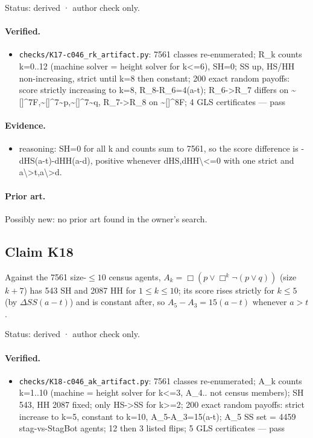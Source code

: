 \documentclass{article}
\begin{document}
Status: derived · author check only.

\paragraph{Verified.}
\begin{itemize}
\item \texttt{checks/K17-c046\_rk\_artifact.py}: 7561 classes re-enumerated; R\_k counts k=0..12 (machine solver = height solver for k\textless{}=6), SH=0; SS up, HS/HH non-increasing, strict until k=8 then constant; 200 exact random payoffs: score strictly increasing to k=8, R\_8-R\_6=4(a-t); R\_6-\textgreater{}R\_7 differs on \textasciitilde{}[]\textasciicircum{}7F,\textasciitilde{}[]\textasciicircum{}7\textasciitilde{}p,\textasciitilde{}[]\textasciicircum{}7\textasciitilde{}q, R\_7-\textgreater{}R\_8 on \textasciitilde{}[]\textasciicircum{}8F; 4 GLS certificates --- pass
\end{itemize}

\paragraph{Evidence.}
\begin{itemize}
\item reasoning: SH=0 for all k and counts sum to 7561, so the score difference is -dHS(a-t)-dHH(a-d), positive whenever dHS,dHH\textbackslash{}\textless{}=0 with one strict and a\textbackslash{}\textgreater{}t,a\textbackslash{}\textgreater{}d.
\end{itemize}

\paragraph{Prior art.} Possibly new: no prior art found in the owner's search.

\subsection*{Claim K18}

Against the 7561 size-$\le10$ census agents, $A_k=\Box(p\lor\Box^k\neg(p\lor q))$ (size $k+7$) has 543 SH and 2087 HH for $1\le k\le10$; its score rises strictly for $k\le5$ (by $\Delta SS(a-t)$) and is constant after, so $A_5-A_3=15(a-t)$ whenever $a>t$.

Status: derived · author check only.

\paragraph{Verified.}
\begin{itemize}
\item \texttt{checks/K18-c046\_ak\_artifact.py}: 7561 classes re-enumerated; A\_k counts k=1..10 (machine = height solver for k\textless{}=3, A\_4.. not census members); SH 543, HH 2087 fixed; only HS-\textgreater{}SS for k\textgreater{}=2; 200 exact random payoffs: strict increase to k=5, constant to k=10, A\_5-A\_3=15(a-t); A\_5 SS set = 4459 stag-vs-StagBot agents; 12 then 3 listed flips; 5 GLS certificates --- pass
\end{itemize}
\end{document}
